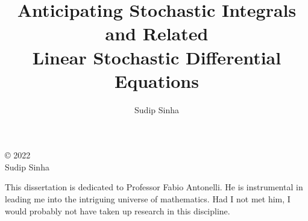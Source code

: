 \documentclass[singlespacing]{lsuthesis}
\title{Anticipating Stochastic Integrals\\
and Related\\
Linear Stochastic Differential Equations}
\author{Sudip Sinha}
\numberwithin{equation}{section}
\theoremstyle{plain}
\theoremstyle{definition}
\theoremstyle{remark}
\begin{document}
\frontmatter

\maketitle


\begin{centeredpage}
© 2022\\
Sudip Sinha
\end{centeredpage}


\begin{centeredpage}
    This dissertation is dedicated to Professor Fabio Antonelli. He is instrumental in leading me into the intriguing universe of mathematics. Had I not met him, I would probably not have taken up research in this discipline.
\end{centeredpage}
\end{document}
